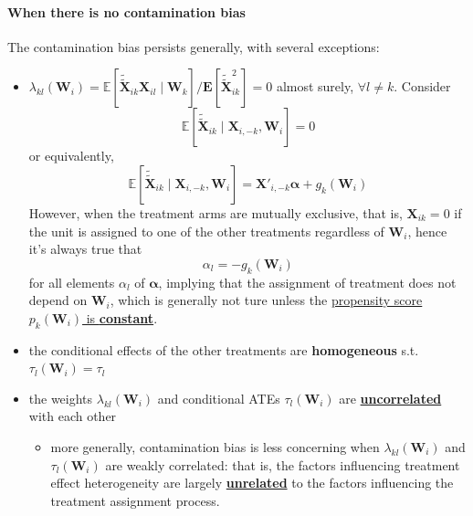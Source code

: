 \documentclass[twoside]{article}
\begin{document}
\paragraph*{When there is no contamination bias}
The contamination bias persists generally, with several exceptions:
\begin{itemize}
    \item $\lambda_{kl}(\mathbf{W}_i) = \mathbb{E}\left[\tilde{\tilde{\mathbf{X}}}_{ik}\mathbf{X}_{il}\mid \mathbf{W}_k\right]/\mathbf{E}\left[\tilde{\tilde{\mathbf{X}}}^2_{ik}\right] = 0$ almost surely, $\forall l\neq k$. Consider 
    $$
    \mathbb{E}\left[ \tilde{\tilde{\mathbf{X}}}_{ik} \mid \mathbf{X}_{i,-k},\mathbf{W}_i \right] = 0
    $$
    or equivalently,
    $$
    \mathbb{E}\left[ \tilde{\tilde{\mathbf{X}}}_{ik} \mid \mathbf{X}_{i,-k},\mathbf{W}_i \right] = \mathbf{X}'_{i,-k}\boldsymbol{\alpha} +g_k(\mathbf{W}_i)
    $$
    However, when the treatment arms are mutually exclusive, that is, $\mathbf{X}_{ik}=0$ if the unit is assigned to one of the other treatments regardless of $\mathbf{W}_i$, hence it's always true that 
    $$
    {\alpha}_l = -g_k(\mathbf{W}_i)
    $$
    for all elements $\alpha_l$ of $\boldsymbol{\alpha}$, implying that the assignment of treatment does not depend on $\mathbf{W}_i$, which is generally not ture unless the \underline{propensity score $p_k(\mathbf{W}_i)$ is \textbf{constant}}.
    \item the conditional effects of the other treatments are \textbf{homogeneous} s.t. $\tau_l(\mathbf{W}_i) = \tau_l$
    \item the weights $\lambda_{kl}(\mathbf{W}_i)$ and conditional ATEs $\tau_l(\mathbf{W}_i)$ are \textbf{\underline{uncorrelated}} with each other
    \begin{itemize}
        \item more generally, contamination bias is less concerning when $\lambda_{kl}(\mathbf{W}_i)$ and $\tau_l(\mathbf{W}_i)$ are weakly correlated: that is, the factors influencing treatment effect heterogeneity are largely \textbf{\underline{unrelated}} to the factors influencing the treatment assignment process.
    \end{itemize}
\end{itemize}
\end{document}
